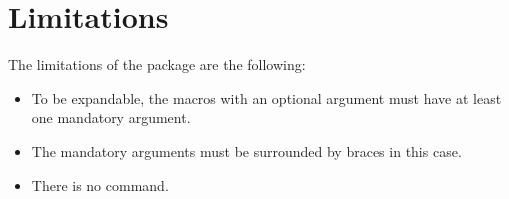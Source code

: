 \documentclass{article}
\begin{document}
\section{Limitations}

The limitations of the package are the following:
%
\begin{itemize}
\item To be expandable, the macros with an optional argument must have
      at least one mandatory argument.

\item The mandatory arguments must be surrounded by braces in this
      case.

\item There is no  command.
\end{itemize}
\end{document}
